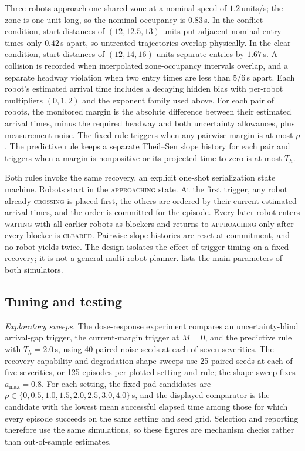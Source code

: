 Three robots approach one shared zone at a nominal speed of $1.2$\,units/s; the
zone is one unit long, so the nominal occupancy is $0.83$\,s.  In the conflict
condition, start distances of $(12,12.5,13)$ units put adjacent nominal entry
times only $0.42$\,s apart, so untreated trajectories overlap physically.  In the
clear condition, start distances of $(12,14,16)$ units separate entries by
$1.67$\,s.  A collision is recorded when interpolated zone-occupancy intervals
overlap, and a separate headway violation when two entry times are less than
$5/6$\,s apart.  Each robot's estimated arrival time includes a decaying hidden
bias with per-robot multipliers $(0,1,2)$ and the exponent family used above.
For each pair of robots, the monitored margin is the absolute difference between
their estimated arrival times, minus the required headway and both uncertainty
allowances, plus measurement noise.  The fixed rule triggers when any pairwise
margin is at most $\rho$.  The predictive rule keeps a separate Theil--Sen slope
history for each pair and triggers when a margin is nonpositive or its projected
time to zero is at most $T_h$.

Both rules invoke the same recovery, an explicit one-shot serialization state
machine.  Robots start in the \textsc{approaching} state.  At the first trigger,
any robot already \textsc{crossing} is placed first, the others are ordered by
their current estimated arrival times, and the order is committed for the
episode.  Every later robot enters \textsc{waiting} with all earlier robots as
blockers and returns to \textsc{approaching} only after every blocker is
\textsc{cleared}.  Pairwise slope histories are reset at commitment, and no robot
yields twice.  The design isolates the effect of trigger timing on a fixed
recovery; it is not a general multi-robot planner.   lists
the main parameters of both simulators.



\subsection{Tuning and testing}

\emph{Exploratory sweeps.}  The dose-response experiment compares an
uncertainty-blind arrival-gap trigger, the current-margin trigger at $M=0$, and
the predictive rule with $T_h=2.0$\,s, using 40 paired noise seeds at each of
seven severities.  The recovery-capability and degradation-shape sweeps use 25
paired seeds at each of five severities, or 125 episodes per plotted setting and
rule; the shape sweep fixes $a_{\max}=0.8$.  For each setting, the fixed-pad
candidates are $\rho\in\{0,0.5,1.0,1.5,2.0,2.5,3.0,4.0\}$\,s, and the displayed
comparator is the candidate with the lowest mean successful elapsed time among
those for which every episode succeeds on the same setting and seed grid.
Selection and reporting therefore use the same simulations, so these figures are
mechanism checks rather than out-of-sample estimates.


